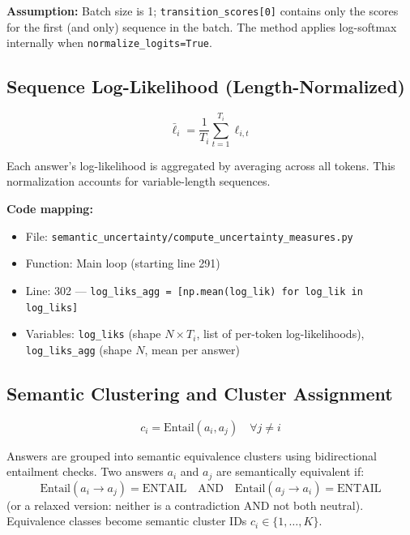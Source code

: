 \documentclass{article}
\begin{document}
\textbf{Assumption:} Batch size is 1; \texttt{transition\_scores[0]} contains only the scores for the first (and only) sequence in the batch. The method applies log-softmax internally when \texttt{normalize\_logits=True}.

\subsection{Sequence Log-Likelihood (Length-Normalized)}

\begin{equation}
\bar{\ell}_i = \frac{1}{T_i} \sum_{t=1}^{T_i} \ell_{i,t}
\label{eq:seq_logprob_normalized}
\end{equation}

Each answer's log-likelihood is aggregated by averaging across all tokens. This normalization accounts for variable-length sequences.

\textbf{Code mapping:}
\begin{itemize}
    \item File: \texttt{semantic\_uncertainty/compute\_uncertainty\_measures.py}
    \item Function: Main loop (starting line 291)
    \item Line: 302 --- \texttt{log\_liks\_agg = [np.mean(log\_lik) for log\_lik in log\_liks]}
    \item Variables: \texttt{log\_liks} (shape $N \times T_i$, list of per-token log-likelihoods), \texttt{log\_liks\_agg} (shape $N$, mean per answer)
\end{itemize}

\subsection{Semantic Clustering and Cluster Assignment}

\begin{equation}
c_i = \text{Entail}(a_i, a_j) \quad \forall j \neq i
\label{eq:semantic_clustering}
\end{equation}

Answers are grouped into semantic equivalence clusters using bidirectional entailment checks. Two answers $a_i$ and $a_j$ are semantically equivalent if:
\begin{equation}
\text{Entail}(a_i \rightarrow a_j) = \text{ENTAIL} \quad \text{AND} \quad \text{Entail}(a_j \rightarrow a_i) = \text{ENTAIL}
\label{eq:equivalence}
\end{equation}
(or a relaxed version: neither is a contradiction AND not both neutral). Equivalence classes become semantic cluster IDs $c_i \in \{1, \ldots, K\}$.
\end{document}
